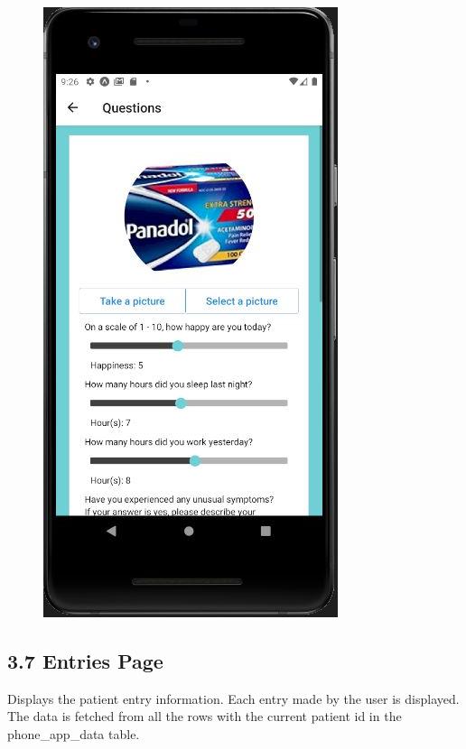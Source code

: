 \documentclass[]{book}
\begin{document}
\begin{figure}
\centering
\includegraphics{./phone_app_doc_images/questionnaire_page.JPG}
\caption{}
\end{figure}

\subsection{3.7 Entries Page}\label{entries-page}

Displays the patient entry information. Each entry made by the user is
displayed. The data is fetched from all the rows with the current
patient id in the phone\_app\_data table.
\end{document}
